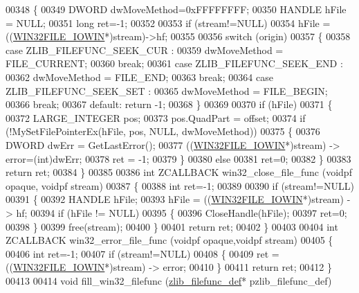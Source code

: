 \begin{DoxyCode}
00348 \{
00349     DWORD dwMoveMethod=0xFFFFFFFF;
00350     HANDLE hFile = NULL;
00351     \textcolor{keywordtype}{long} ret=-1;
00352 
00353     \textcolor{keywordflow}{if} (stream!=NULL)
00354         hFile = ((\hyperlink{struct_w_i_n32_f_i_l_e___i_o_w_i_n}{WIN32FILE\_IOWIN}*)stream)->hf;
00355 
00356     \textcolor{keywordflow}{switch} (origin)
00357     \{
00358         \textcolor{keywordflow}{case} ZLIB\_FILEFUNC\_SEEK\_CUR :
00359             dwMoveMethod = FILE\_CURRENT;
00360             \textcolor{keywordflow}{break};
00361         \textcolor{keywordflow}{case} ZLIB\_FILEFUNC\_SEEK\_END :
00362             dwMoveMethod = FILE\_END;
00363             \textcolor{keywordflow}{break};
00364         \textcolor{keywordflow}{case} ZLIB\_FILEFUNC\_SEEK\_SET :
00365             dwMoveMethod = FILE\_BEGIN;
00366             \textcolor{keywordflow}{break};
00367         \textcolor{keywordflow}{default}: \textcolor{keywordflow}{return} -1;
00368     \}
00369 
00370     \textcolor{keywordflow}{if} (hFile)
00371     \{
00372         LARGE\_INTEGER pos;
00373         pos.QuadPart = offset;
00374         \textcolor{keywordflow}{if} (!MySetFilePointerEx(hFile, pos, NULL, dwMoveMethod))
00375         \{
00376             DWORD dwErr = GetLastError();
00377             ((\hyperlink{struct_w_i_n32_f_i_l_e___i_o_w_i_n}{WIN32FILE\_IOWIN}*)stream) -> error=(int)dwErr;
00378             ret = -1;
00379         \}
00380         \textcolor{keywordflow}{else}
00381             ret=0;
00382     \}
00383     \textcolor{keywordflow}{return} ret;
00384 \}
00385 
00386 \textcolor{keywordtype}{int} ZCALLBACK win32\_close\_file\_func (voidpf opaque, voidpf stream)
00387 \{
00388     \textcolor{keywordtype}{int} ret=-1;
00389 
00390     \textcolor{keywordflow}{if} (stream!=NULL)
00391     \{
00392         HANDLE hFile;
00393         hFile = ((\hyperlink{struct_w_i_n32_f_i_l_e___i_o_w_i_n}{WIN32FILE\_IOWIN}*)stream) -> hf;
00394         \textcolor{keywordflow}{if} (hFile != NULL)
00395         \{
00396             CloseHandle(hFile);
00397             ret=0;
00398         \}
00399         free(stream);
00400     \}
00401     \textcolor{keywordflow}{return} ret;
00402 \}
00403 
00404 \textcolor{keywordtype}{int} ZCALLBACK win32\_error\_file\_func (voidpf opaque,voidpf stream)
00405 \{
00406     \textcolor{keywordtype}{int} ret=-1;
00407     \textcolor{keywordflow}{if} (stream!=NULL)
00408     \{
00409         ret = ((\hyperlink{struct_w_i_n32_f_i_l_e___i_o_w_i_n}{WIN32FILE\_IOWIN}*)stream) -> error;
00410     \}
00411     \textcolor{keywordflow}{return} ret;
00412 \}
00413 
00414 \textcolor{keywordtype}{void} fill\_win32\_filefunc (\hyperlink{structzlib__filefunc__def__s}{zlib\_filefunc\_def}* pzlib\_filefunc\_def)

\end{DoxyCode}
